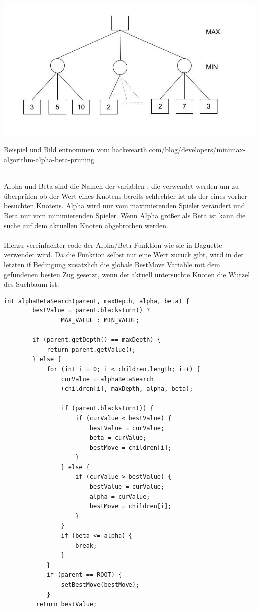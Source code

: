 \documentclass[12pt,a4paper]{article}
\begin{document}
\includegraphics[scale=0.5]{alpha-beta-pruning.jpg}\\
\begin{tiny}
Beispiel und Bild entnommen von: hackerearth.com/blog/developers/minimax-algorithm-alpha-beta-pruning
\end{tiny}\\
Alpha und Beta sind die Namen der variablen , die verwendet werden um zu überprüfen ob der Wert eines Knotens bereits schlechter ist als der eines vorher besuchten Knotens. Alpha wird nur vom maximierenden Spieler verändert und Beta nur vom minimierenden Spieler.
Wenn Alpha größer als Beta ist kann die suche auf dem aktuellen Knoten abgebrochen werden.
\\\\
Hierzu vereinfachter code der Alpha/Beta Funktion wie sie in Baguette verwendet wird. Da die Funktion selbst nur eine Wert zurück gibt, wird in der letzten if Bedingung zusätzlich die globale BestMove Variable mit dem gefundenen besten Zug gesetzt, wenn der aktuell untersuchte Knoten die Wurzel des Suchbaum ist.
\begin{lstlisting}[frame=single]
int alphaBetaSearch(parent, maxDepth, alpha, beta) {
        bestValue = parent.blacksTurn() ?
                MAX_VALUE : MIN_VALUE;

        if (parent.getDepth() == maxDepth) {
            return parent.getValue();
        } else {
            for (int i = 0; i < children.length; i++) {
                curValue = alphaBetaSearch
                (children[i], maxDepth, alpha, beta);

                if (parent.blacksTurn()) {
                    if (curValue < bestValue) {
                        bestValue = curValue;
                        beta = curValue;
                        bestMove = children[i];
                    }
                } else {
                    if (curValue > bestValue) {
                        bestValue = curValue;
                        alpha = curValue;
                        bestMove = children[i];
                    }
                }
                if (beta <= alpha) {
                    break;
                }
            }
            if (parent == ROOT) {
                setBestMove(bestMove);
            }
         return bestValue;
\end{lstlisting}
\end{document}
